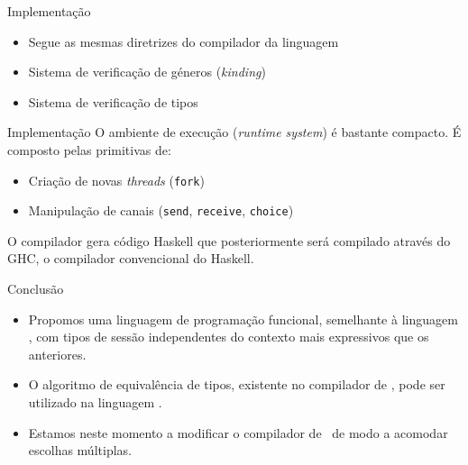
\begin{frame}[fragile]{Implementação}
  \begin{itemize}
  \item Segue as mesmas diretrizes do compilador da linguagem \freest
    \pause
    \vspace{1cm}
  \item Sistema de verificação de géneros (\textit{kinding})
    \pause
    \vspace{1cm}    
  \item Sistema de verificação de tipos
  \end{itemize}
\end{frame}

\begin{frame}[fragile]{Implementação}  
  O ambiente de execução (\textit{runtime system}) é bastante compacto.
  É composto pelas primitivas de:
  
  \begin{itemize}
  \item Criação de novas \textit{threads} (\lstinline|fork|)\pause
  \item Manipulação de canais (\lstinline|send|, \lstinline|receive|, \lstinline|choice|)
  \end{itemize}
\pause
\vspace{5mm}
O compilador gera código Haskell que posteriormente será compilado através do GHC, o compilador convencional do Haskell. 
\end{frame}

\begin{frame}[fragile]{Conclusão}
  \begin{itemize}
  \item Propomos uma linguagem de programação funcional, semelhante à linguagem \freest, com tipos de sessão independentes do contexto mais expressivos que os anteriores.
    \pause
    \vspace{1cm}
  \item O algoritmo de equivalência de tipos, existente no compilador de \freest, pode ser utilizado na linguagem \mixedchoice.
    \pause
    \vspace{1cm}    
  \item Estamos neste momento a modificar o compilador de
  \freest$\,$ de modo a acomodar escolhas múltiplas.  
  \end{itemize}
\end{frame}


